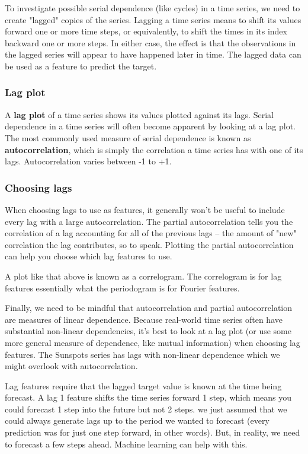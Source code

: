 \documentclass[12pt]{report}
\begin{document}
To investigate possible serial dependence (like cycles) in a time series, we need to create "lagged" copies of the series. Lagging a time series means to shift its values forward one or more time steps, or equivalently, to shift the times in its index backward one or more steps. In either case, the effect is that the observations in the lagged series will appear to have happened later in time. The lagged data can be used as a feature to predict the target.

\subsubsection{Lag plot}
A \textbf{lag plot} of a time series shows its values plotted against its lags. Serial dependence in a time series will often become apparent by looking at a lag plot. The most commonly used measure of serial dependence is known as \textbf{autocorrelation}, which is simply the correlation a time series has with one of its lags. Autocorrelation varies between -1 to +1.


\subsubsection{Choosing lags}
When choosing lags to use as features, it generally won't be useful to include every lag with a large autocorrelation. The partial autocorrelation tells you the correlation of a lag accounting for all of the previous lags -- the amount of "new" correlation the lag contributes, so to speak. Plotting the partial autocorrelation can help you choose which lag features to use.

A plot like that above is known as a correlogram. The correlogram is for lag features essentially what the periodogram is for Fourier features.

Finally, we need to be mindful that autocorrelation and partial autocorrelation are measures of linear dependence. Because real-world time series often have substantial non-linear dependencies, it's best to look at a lag plot (or use some more general measure of dependence, like mutual information) when choosing lag features. The Sunspots series has lags with non-linear dependence which we might overlook with autocorrelation.

Lag features require that the lagged target value is known at the time being forecast. A lag 1 feature shifts the time series forward 1 step, which means you could forecast 1 step into the future but not 2 steps. we just assumed that we could always generate lags up to the period we wanted to forecast (every prediction was for just one step forward, in other words). But, in reality, we need to forecast a few steps ahead. Machine learning can help with this.
\end{document}
